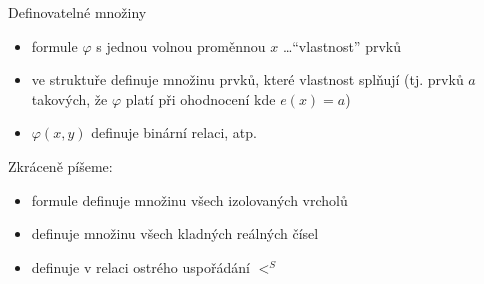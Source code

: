 \documentclass{beamer}
\begin{document}
\begin{frame}{Definovatelné množiny}

    \begin{itemize}
        \item formule $\varphi$ s jednou volnou proměnnou $x$ \dots ``vlastnost'' prvků
        \item ve struktuře \alert{definuje} množinu prvků, které vlastnost splňují (tj. prvků $a$ takových, že $\varphi$ platí při ohodnocení kde $e(x)=a$)
        \item $\varphi(x,y)$ definuje binární relaci, atp.
    \end{itemize}
    

    Zkráceně píšeme: 

    \begin{itemize}
        \item formule  definuje  množinu všech \alert{izolovaných} vrcholů
        \item {} definuje  množinu všech kladných reálných čísel
        \item {} definuje v  relaci \alert{ostrého uspořádání} $<^S$
    \end{itemize}

\end{frame}
\end{document}

